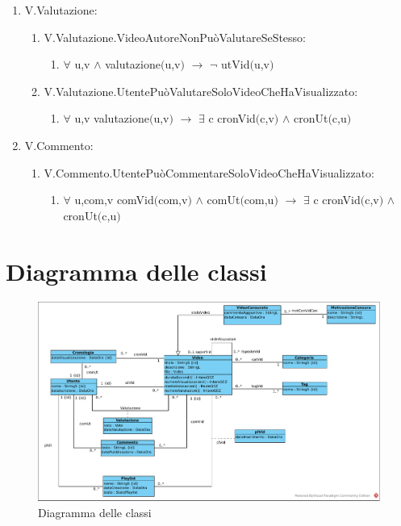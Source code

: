 \documentclass{article}
\begin{document}
\begin{enumerate}
    \item V.Valutazione:
    \begin{enumerate}
        \item V.Valutazione.VideoAutoreNonPuòValutareSeStesso:
        \begin{enumerate}
            \item $\forall$ u,v $\land$ valutazione$($u,v$)$ $\rightarrow$ $\neg$ utVid$($u,v$)$
        \end{enumerate}
        \item V.Valutazione.UtentePuòValutareSoloVideoCheHaVisualizzato:
        \begin{enumerate}
            \item $\forall$ u,v valutazione$($u,v$)$ $\rightarrow$ $\exists$ c cronVid$($c,v$)$ $\land$ cronUt$($c,u$)$
        \end{enumerate}
    \end{enumerate}
    \item V.Commento:
    \begin{enumerate}
        \item V.Commento.UtentePuòCommentareSoloVideoCheHaVisualizzato:
        \begin{enumerate}
            \item $\forall$ u,com,v comVid$($com,v$)$ $\land$ comUt$($com,u$)$ $\rightarrow$ $\exists$ c cronVid$($c,v$)$ $\land$ cronUt$($c,u$)$
        \end{enumerate}
    \end{enumerate}
\end{enumerate}

\newpage

\section{\label{sec:DiagrammaDelleClassi}Diagramma delle classi}
\begin{figure}[h]
    \centering
    \includegraphics[width=1\textwidth]{../Diagrammi/diagramma delle classi.pdf}
    \caption{Diagramma delle classi}
\end{figure}

\newpage
\end{document}
